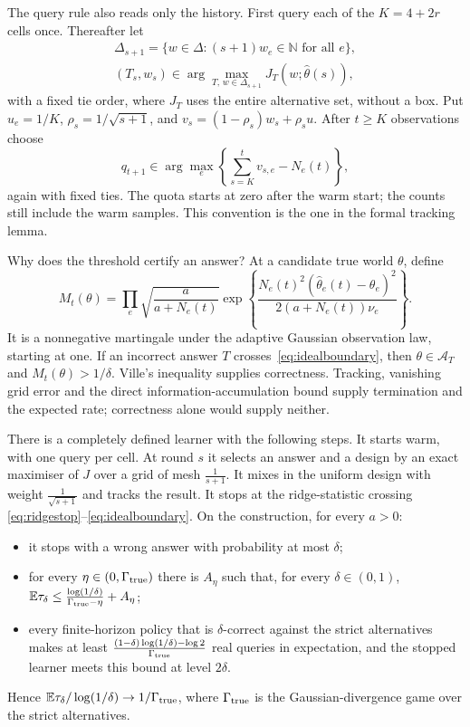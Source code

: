 The query rule also reads only the history. First query each of the $K=4+2r$ cells once.
Thereafter let
\begin{gather*}
\Delta_{s+1}=\{w\in\Delta:(s+1)w_e\in\mathbb N\text{ for all }e\},\\
(T_s,w_s)\in\arg\max_{T,\,w\in\Delta_{s+1}}J_T(w;\widehat\theta(s)),
\end{gather*}
with a fixed tie order, where $J_T$ uses the entire alternative set, without a box.
Put $u_e=1/K$, $\rho_s=1/\sqrt{s+1}$, and $v_s=(1-\rho_s)w_s+\rho_su$.
After $t\ge K$ observations choose
\[
q_{t+1}\in\arg\max_e\left\{\sum_{s=K}^{t}v_{s,e}-N_e(t)\right\},
\]
again with fixed ties. The quota starts at zero after the warm start; the counts still
include the warm samples. This convention is the one in the formal tracking lemma.

Why does the threshold certify an answer? At a candidate true world $\theta$, define
\[
M_t(\theta)=\prod_e\sqrt{\frac{a}{a+N_e(t)}}
\exp\left\{\frac{N_e(t)^2(\widehat\theta_e(t)-\theta_e)^2}
{2(a+N_e(t))\nu_e}\right\}.
\]
It is a nonnegative martingale under the adaptive Gaussian observation law, starting at one.
If an incorrect answer $T$ crosses~\eqref{eq:idealboundary}, then
$\theta\in\mathcal A_T$ and $M_t(\theta)>1/\delta$.
Ville's inequality supplies correctness. Tracking, vanishing grid error and the direct
information-accumulation bound supply termination and the expected rate; correctness alone
would supply neither.

\begin{theorem}
\label{thm:ideal}
There is a completely defined learner with the following steps. It starts warm, with one query
per cell. At round $s$ it selects an answer and a design by an exact maximiser of $J$ over a
grid of mesh $\frac{1}{s+1}$. It mixes in the uniform design with weight
$\frac{1}{\sqrt{s+1}}$ and tracks the result. It stops at the ridge-statistic crossing
\eqref{eq:ridgestop}--\eqref{eq:idealboundary}. On the construction,
for every $a>0$:
\begin{itemize}
\item it stops with a wrong answer with probability at most $\delta$;
\item for every $\eta\in(0,\Gamma_{\rm true})$ there is $A_{\eta}$ such that, for every
$\delta\in(0,1)$, $\mathbb{E}\tau_{\delta}\le\frac{\log(1/\delta)}{\Gamma_{\rm true}-\eta}+A_{\eta}$;
\item every finite-horizon policy that is $\delta$-correct against the strict alternatives
makes at least $\frac{(1-\delta)\log(1/\delta)-\log2}{\Gamma_{\rm true}}$ real queries in
expectation, and the stopped learner meets this bound at level $2\delta$.
\end{itemize}
Hence $\mathbb{E}\tau_{\delta}/\log(1/\delta)\to1/\Gamma_{\rm true}$, where $\Gamma_{\rm true}$ is
the Gaussian-divergence game over the strict alternatives.
\end{theorem}

